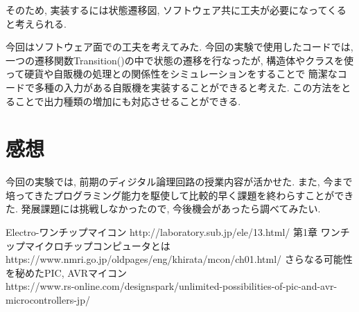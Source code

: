 \documentclass[titlepage]{jsarticle}
\begin{document}
    そのため, 実装するには状態遷移図, ソフトウェア共に工夫が必要になってくると考えられる.

    今回はソフトウェア面での工夫を考えてみた.
    今回の実験で使用したコードでは, 一つの遷移関数Transition()の中で状態の遷移を行なったが, 
    構造体やクラスを使って硬貨や自販機の処理との関係性をシミュレーションをすることで
    簡潔なコードで多種の入力がある自販機を実装することができると考えた.
    この方法をとることで出力種類の増加にも対応させることができる.

\section{感想}
    今回の実験では, 前期のディジタル論理回路の授業内容が活かせた.
    また, 今まで培ってきたプログラミング能力を駆使して比較的早く課題を終わらすことができた.
    発展課題には挑戦しなかったので, 今後機会があったら調べてみたい.

\begin{thebibliography}{99}
     Electro-ワンチップマイコン http://laboratory.sub.jp/ele/13.html/
     第1章 ワンチップマイクロチップコンピュータとは \\
        https://www.nmri.go.jp/oldpages/eng/khirata/mcon/ch01.html/
     さらなる可能性を秘めたPIC, AVRマイコン \\
        https://www.rs-online.com/designspark/unlimited-possibilities-of-pic-and-avr-microcontrollers-jp/
\end{thebibliography}
\end{document}
